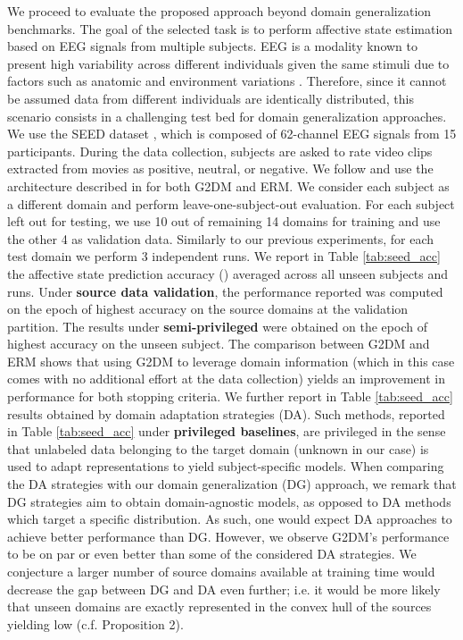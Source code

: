 \documentclass{article}
\begin{document}
We proceed to evaluate the proposed approach beyond domain generalization benchmarks. The goal of the selected task is to perform affective state estimation based on EEG signals from multiple subjects. EEG is a modality known to present high variability across different individuals given the same stimuli due to factors such as anatomic and environment variations \cite{wu2015reducing}. Therefore, since it cannot be assumed data from different individuals are identically distributed, this scenario consists in a challenging test bed for domain generalization approaches. We use the SEED dataset \cite{zheng2015investigating}, which is composed of 62-channel EEG signals from 15 participants. During the data collection, subjects are asked to rate video clips extracted from movies as positive, neutral, or negative. We follow \cite{li2018extracting} and use the architecture described in \cite{li2017targeting} for both G2DM and ERM. We consider each subject as a different domain and perform leave-one-subject-out evaluation. For each subject left out for testing, we use 10 out of remaining 14 domains for training and use the other 4 as validation data. Similarly to our previous experiments, for each test domain we perform 3 independent runs. We report in Table \ref{tab:seed_acc} the affective state prediction accuracy () averaged across all unseen subjects and runs. Under \textbf{source data validation}, the performance reported was computed on the epoch of highest accuracy on the source domains at the validation partition. The results under \textbf{semi-privileged} were obtained on the epoch of highest accuracy on the unseen subject. The comparison between G2DM and ERM shows that using G2DM to leverage domain information (which in this case comes with no additional effort at the data collection) yields an improvement in performance for both stopping criteria. 
We further report in Table \ref{tab:seed_acc} results obtained by domain adaptation strategies (DA). Such methods, reported in Table \ref{tab:seed_acc} under \textbf{privileged baselines}, are privileged in the sense that unlabeled data belonging to the target domain (unknown in our case) is used to adapt representations to yield subject-specific models. When comparing the DA strategies with our domain generalization (DG) approach, we remark that DG strategies aim to obtain domain-agnostic models, as opposed to DA methods which target a specific distribution. As such, one would expect DA approaches to achieve better performance than DG. However, we observe G2DM's performance to be on par or even better than some of the considered DA strategies. We conjecture a larger number of source domains available at training time would decrease the gap between DG and DA even further; i.e. it would be more likely that unseen domains are exactly represented in the convex hull of the sources yielding low  (c.f. Proposition 2).
\end{document}
